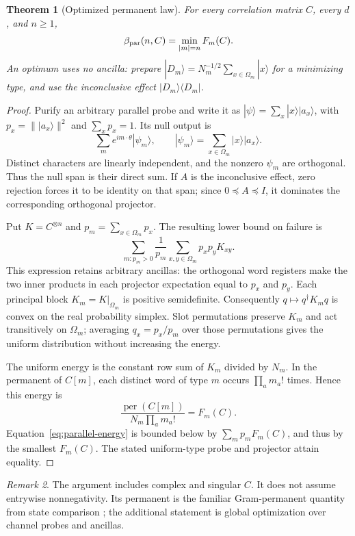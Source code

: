 \documentclass[11pt,a4paper]{article}
\newtheorem{theorem}{Theorem}[section]
\theoremstyle{remark}
\newtheorem{remark}[theorem]{Remark}
\DeclareMathOperator{\per}{per}
\newcommand{\ket}[1]{|#1\rangle}
\newcommand{\bra}[1]{\langle#1|}
\begin{document}
\begin{theorem}[Optimized permanent law]\label{thm:parallel}
For every correlation matrix \(C\), every \(d\), and \(n\geq1\),
\begin{equation}\label{eq:parallel}
 \beta_{\rm par}(n,C)=\min_{|m|=n}F_m(C).
\end{equation}
An optimum uses no ancilla: prepare
\(\ket{D_m}=N_m^{-1/2}\sum_{x\in\Omega_m}\ket x\) for a minimizing type,
and use the inconclusive effect \(\ket{D_m}\bra{D_m}\).
\end{theorem}
\begin{proof}
Purify an arbitrary parallel probe and write it as
\(\ket\psi=\sum_x\ket x\ket{a_x}\), with
\(p_x=\|\ket{a_x}\|^2\) and \(\sum_xp_x=1\).
Its null output is
\[
 \sum_m e^{im\cdot\theta}\ket{\psi_m},
 \qquad \ket{\psi_m}=\sum_{x\in\Omega_m}\ket x\ket{a_x}.
\]
Distinct characters are linearly independent, and the nonzero
\(\psi_m\) are orthogonal. Thus the null span is their direct sum.
If \(A\) is the inconclusive effect, zero rejection forces it to be
identity on that span; since \(0\preceq A\preceq I\), it dominates
the corresponding orthogonal projector.

Put \(K=C^{\otimes n}\) and \(p_m=\sum_{x\in\Omega_m}p_x\).
The resulting lower bound on failure is
\begin{equation}\label{eq:parallel-energy}
 \sum_{m:p_m>0}\frac{1}{p_m}
     \sum_{x,y\in\Omega_m}p_xp_y K_{xy}.
\end{equation}
This expression retains arbitrary ancillas: the orthogonal word registers
make the two inner products in each projector expectation equal to
\(p_x\) and \(p_y\).
Each principal block \(K_m=K|_{\Omega_m}\) is positive semidefinite.
Consequently \(q\mapsto q^\dagger K_m q\) is convex on the real probability
simplex. Slot permutations preserve \(K_m\) and act transitively on
\(\Omega_m\); averaging \(q_x=p_x/p_m\) over those permutations gives the
uniform distribution without increasing the energy.

The uniform energy is the constant row sum of \(K_m\) divided by \(N_m\).
In the permanent of \(C[m]\), each distinct word of type \(m\) occurs
\(\prod_a m_a!\) times. Hence this energy is
\[
 \frac{\per(C[m])}{N_m\prod_a m_a!}=F_m(C).
\]
Equation~\eqref{eq:parallel-energy} is bounded below by
\(\sum_m p_m F_m(C)\), and thus by the smallest \(F_m(C)\).
The stated uniform-type probe and projector attain equality.
\end{proof}

\begin{remark}
The argument includes complex and singular \(C\). It does not assume
entrywise nonnegativity. Its permanent is the familiar Gram-permanent
quantity from state comparison \cite{chefles}; the additional statement
is global optimization over channel probes and ancillas.
\end{remark}
\end{document}
